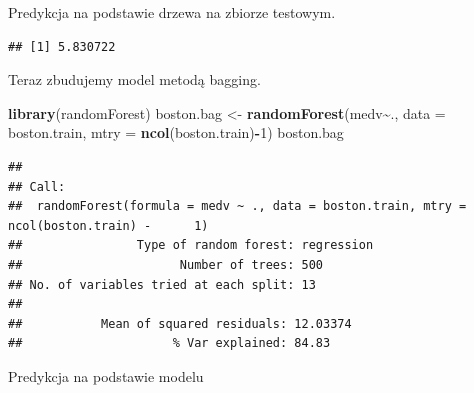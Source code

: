 \documentclass[
]{book}
\newenvironment{Shaded}{\begin{snugshade}}{\end{snugshade}}
\newcommand{\AttributeTok}[1]{\textcolor[rgb]{0.13,0.29,0.53}{#1}}
\newcommand{\ControlFlowTok}[1]{\textcolor[rgb]{0.13,0.29,0.53}{\textbf{#1}}}
\newcommand{\DecValTok}[1]{\textcolor[rgb]{0.00,0.00,0.81}{#1}}
\newcommand{\FunctionTok}[1]{\textcolor[rgb]{0.13,0.29,0.53}{\textbf{#1}}}
\newcommand{\NormalTok}[1]{#1}
\newcommand{\OtherTok}[1]{\textcolor[rgb]{0.56,0.35,0.01}{#1}}
\newcommand{\SpecialCharTok}[1]{\textcolor[rgb]{0.81,0.36,0.00}{\textbf{#1}}}
\theoremstyle{plain}
\theoremstyle{definition}
\theoremstyle{definition}
\theoremstyle{definition}
\theoremstyle{definition}
\theoremstyle{definition}
\theoremstyle{remark}
\begin{document}
Predykcja na podstawie drzewa na zbiorze testowym.

\begin{Shaded}
\end{Shaded}

\begin{verbatim}
## [1] 5.830722
\end{verbatim}

Teraz zbudujemy model metodą bagging.

\begin{Shaded}
\begin{Highlighting}[]
\FunctionTok{library}\NormalTok{(randomForest)}
\NormalTok{boston.bag }\OtherTok{\textless{}{-}} \FunctionTok{randomForest}\NormalTok{(medv}\SpecialCharTok{\textasciitilde{}}\NormalTok{., }\AttributeTok{data =}\NormalTok{ boston.train, }
                           \AttributeTok{mtry =} \FunctionTok{ncol}\NormalTok{(boston.train)}\SpecialCharTok{{-}}\DecValTok{1}\NormalTok{)}
\NormalTok{boston.bag}
\end{Highlighting}
\end{Shaded}

\begin{verbatim}
## 
## Call:
##  randomForest(formula = medv ~ ., data = boston.train, mtry = ncol(boston.train) -      1) 
##                Type of random forest: regression
##                      Number of trees: 500
## No. of variables tried at each split: 13
## 
##           Mean of squared residuals: 12.03374
##                     % Var explained: 84.83
\end{verbatim}

Predykcja na podstawie modelu

\begin{Shaded}
\end{Shaded}
\end{document}
